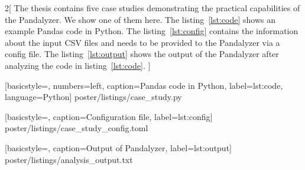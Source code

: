 
\setlength{\columnsep}{20cm}
\begin{multicols}{2}[
The thesis contains five case studies demonstrating the practical capabilities of the Pandalyzer.
We show one of them here. The listing~\ref{lst:code} shows an example Pandas code in Python.
The listing~\ref{lst:config} contains the information about the input CSV files and needs to be provided to the
Pandalyzer via a config file.
The listing~\ref{lst:output} shows the output of the Pandalyzer after analyzing the code in listing~\ref{lst:code}.
]





    [basicstyle=\normalsize\ttfamily, numbers=left, caption=Pandas code in Python, label={lst:code}, language=Python]
    {poster/listings/case_study.py}

\vfill\null
\columnbreak


    [basicstyle=\normalsize\ttfamily, caption=Configuration file, label={lst:config}]
    {poster/listings/case_study_config.toml}

    [basicstyle=\normalsize\ttfamily, caption=Output of Pandalyzer, label={lst:output}]
    {poster/listings/analysis_output.txt}

\end{multicols}